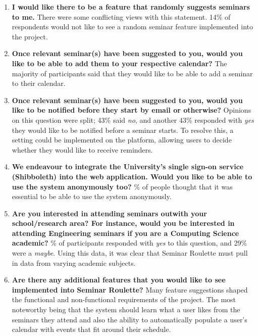 \documentclass{l4proj}
\begin{document}
\begin{enumerate}
    \item \textbf{I would like there to be a feature that randomly suggests seminars to me.}
    \newline
    There were some conflicting views with this statement. 14\% of respondents would not like to see a random seminar feature implemented into the project.
    
    \item \textbf{Once relevant seminar(s) have been suggested to you, would you like to be able to add them to your respective calendar?}
    \newline
    The majority of participants said that they would like to be able to add a seminar to their calendar.
    
    \item \textbf{Once relevant seminar(s) have been suggested to you, would you like to be notified before they start by email or otherwise?}
    \newline
    Opinions on this question were split; 43\% said \emph{no}, and another 43\% responded with \emph{yes} they would like to be notified before a seminar starts. To resolve this, a setting could be implemented on the platform, allowing users to decide whether they would like to receive reminders.
    
    \item \textbf{We endeavour to integrate the University's single sign-on service (Shibboleth) into the web application. Would you like to be able to use the system anonymously too?}
    \% of people thought that it was essential to be able to use the system anonymously.
    
    \item \textbf{Are you interested in attending seminars outwith your school/research area? For instance, would you be interested in attending Engineering seminars if you are a Computing Science academic?}
    \% of participants responded with \emph{yes} to this question, and 29\% were a \emph{maybe}. Using this data, it was clear that Seminar Roulette must pull in data from varying academic subjects.
    
    \item \textbf{Are there any additional features that you would like to see implemented into Seminar Roulette?}
    \newline
    Many feature suggestions shaped the functional and non-functional requirements of the project. The most noteworthy being that the system should learn what a user likes from the seminars they attend and also the ability to automatically populate a user's calendar with events that fit around their schedule.
\end{enumerate}
\end{document}
